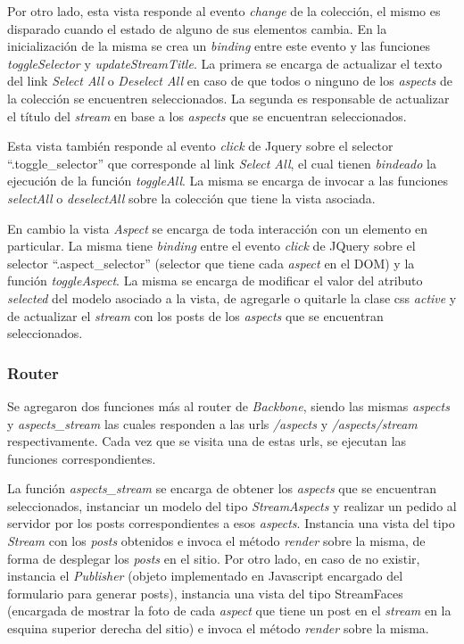 Por otro lado, esta vista responde al evento \emph{change} de la colección, el mismo es disparado cuando el estado de alguno de sus elementos cambia. En la inicialización de la
misma se crea un \emph{binding} entre este evento y las funciones \emph{toggleSelector} y \emph{updateStreamTitle}. La primera se encarga de actualizar el texto del link
\emph{Select All} o \emph{Deselect All} en caso de que todos o ninguno de los \emph{aspects} de la colección se encuentren seleccionados. La segunda es responsable de actualizar
el título del \emph{stream} en base a los \emph{aspects} que se encuentran seleccionados. 

Esta vista también responde al evento \emph{click} de Jquery sobre el selector ``.toggle\_selector'' que corresponde al link \emph{Select All}, el cual tienen \emph{bindeado} la
 ejecución de la función \emph{toggleAll}. La misma se encarga de invocar a las funciones \emph{selectAll} o \emph{deselectAll} sobre la colección que tiene la vista asociada.


En cambio la vista \emph{Aspect} se encarga de toda interacción con un elemento en particular. La misma tiene \emph{binding} entre el evento \emph{click} de JQuery sobre el
selector ``.aspect\_selector'' (selector que tiene cada \emph{aspect} en el DOM) y la función \emph{toggleAspect}. La misma se encarga de modificar el valor del atributo
\emph{selected}  del modelo asociado a la vista, de agregarle o quitarle la clase css \emph{active} y de actualizar el \emph{stream} con los posts de los \emph{aspects} que se
encuentran seleccionados.

\subsubsection{Router}

Se agregaron dos funciones más al router de \emph{Backbone}, siendo las mismas \emph{aspects} y \emph{aspects\_stream} las cuales responden a las urls \emph{/aspects} y
\emph{/aspects/stream} respectivamente. Cada vez que se visita una de estas urls, se ejecutan las funciones correspondientes.

La función \emph{aspects\_stream} se encarga de obtener los \emph{aspects} que se encuentran seleccionados, instanciar un modelo del tipo \emph{StreamAspects} y realizar un pedido al
servidor por los posts correspondientes a esos \emph{aspects}. Instancia una  vista del tipo \emph{Stream} con los \emph{posts} obtenidos e invoca el método \emph{render} sobre la misma,
de forma de desplegar los \emph{posts} en el sitio. Por otro lado, en caso de no existir, instancia el \emph{Publisher} (objeto implementado en Javascript encargado del formulario para
generar posts), instancia una vista del tipo StreamFaces (encargada de mostrar la foto de cada \emph{aspect} que tiene un post en el \emph{stream} en la esquina superior derecha
del sitio) e invoca el método \emph{render} sobre la misma.

